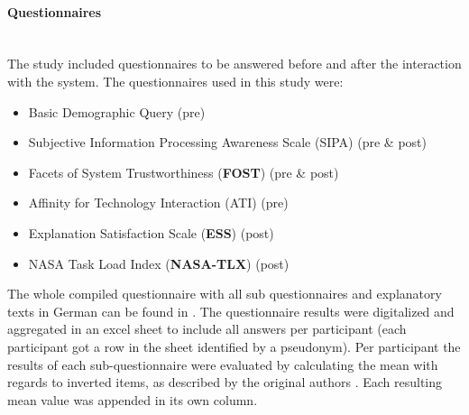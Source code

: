 \documentclass[11pt,a4paper,english]{scrreprt}
\begin{document}
\paragraph{Questionnaires}\mbox{} \\
The study included questionnaires to be answered before and after the interaction with the system. The questionnaires used in this study were:
\begin{itemize}
    \item Basic Demographic Query (pre)
    \item Subjective Information Processing Awareness Scale (SIPA) \parencite{schrills_sipas_2021} (pre \& post)
    \item Facets of System Trustworthiness (\textbf{FOST}) \parencite{franke_advancing_2015} (pre \& post)
    \item Affinity for Technology Interaction (ATI) \parencite{franke_personal_2019} (pre)
    \item Explanation Satisfaction Scale (\textbf{ESS}) \parencite{hoffman_metrics_2019} (post)
    \item NASA Task Load Index (\textbf{NASA-TLX}) \parencite{hart_nasa-task_2006} (post)
\end{itemize}
The whole compiled questionnaire with all sub questionnaires and explanatory texts in German can be found in . The questionnaire results were digitalized and aggregated in an excel sheet to include all answers per participant (each participant got a row in the sheet identified by a pseudonym). Per participant the results  of each sub-questionnaire were evaluated by calculating the mean with regards to inverted items, as described by the original authors \parencite{schrills_sipas_2021,franke_personal_2019,franke_advancing_2015,hoffman_metrics_2019,hart_nasa-task_2006}. Each resulting mean value was appended in its own column.
\end{document}
